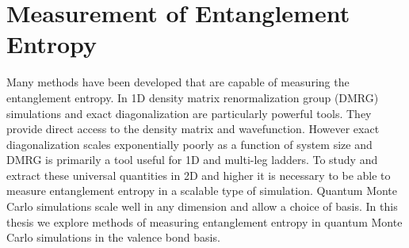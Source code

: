\section{Measurement of Entanglement Entropy}

Many methods have been developed that are capable of measuring the entanglement entropy. In 1D density matrix renormalization group (DMRG) simulations and exact diagonalization are particularly powerful tools. They provide direct access to the density matrix and wavefunction. However exact diagonalization scales exponentially poorly as a function of system size and DMRG is primarily a tool useful for 1D and multi-leg ladders. To study and extract these universal quantities in 2D and higher it is necessary to be able to measure entanglement entropy in a scalable type of simulation. 
Quantum Monte Carlo simulations scale well in any dimension and allow a choice of basis. 
In this thesis we explore methods of measuring entanglement entropy in quantum Monte Carlo simulations in the valence bond basis.


